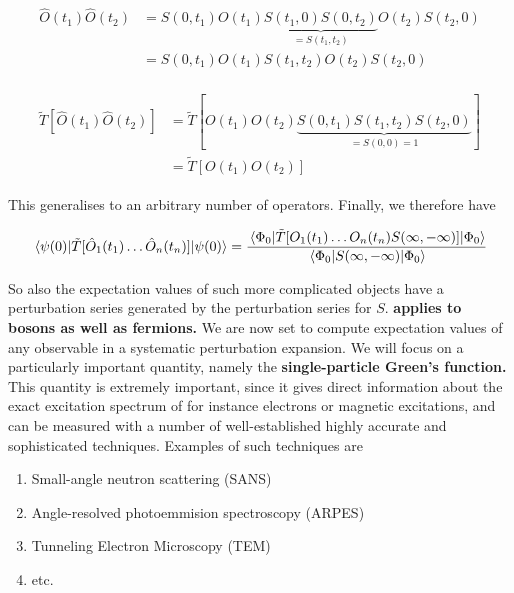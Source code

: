 \begin{align}
\begin{split} 
\hat{O}(t_1)\hat{O}(t_2) &= S(0, t_1)O(t_1)\underbrace{S(t_1, 0)S(0, t_2)}_{=S(t_1, t_2)}O(t_2)S(t_2, 0) \\
&= S(0,t_1)O(t_1)S(t_1, t_2)O(t_2)S(t_2, 0)
\end{split}
\end{align}

\begin{align}
\begin{split}
\tilde{T}[\hat{O}(t_1)\hat{O}(t_2)] &= \tilde{T}[O(t_1)O(t_2)\underbrace{S(0,t_1)S(t_1, t_2)S(t_2, 0)}_{=S(0,0)=1}] \\
&=\tilde{T}[O(t_1)O(t_2)]
\end{split}
\end{align}

This generalises to an arbitrary number of operators. Finally, we therefore have 
\begin{tcolorbox}
	\begin{equation}
	\label{eq:gell_man_low}
	\ev{\tilde{T}[\hat O_1(t_1)\dots\hat O_n(t_n)]}{\psi(0)} = \frac{\ev{\tilde{T}[O_1(t_1)\dots O_n(t_n)S(\infty, -\infty)]}{\Phi_0}}{\ev{S(\infty, -\infty)}{\Phi_0}}
	\end{equation}
\end{tcolorbox}
So also the expectation values of such more complicated objects have a perturbation series generated by the perturbation series for $S$.\textbf{  applies to bosons as well as fermions.}
We are now set to compute expectation values of any observable in a systematic perturbation expansion. We will focus on a particularly important quantity, namely the \textbf{single-particle Green's function.} This quantity is extremely important, since it gives direct information about the exact excitation spectrum of for instance electrons or magnetic excitations, and can be measured with a number of well-established highly accurate and sophisticated techniques. Examples of such techniques are 
\begin{enumerate}
	\item Small-angle neutron scattering (SANS)
	\item Angle-resolved photoemmision spectroscopy (ARPES)
	\item Tunneling Electron Microscopy (TEM) 
	\item etc.
\end{enumerate}



